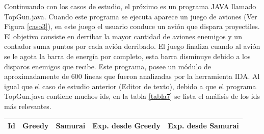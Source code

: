 Continuando con los casos de estudio, el próximo es un programa JAVA llamado TopGun.java. Cuando este programa se ejecuta aparece un juego de aviones (Ver Figura \ref{caso3}), en este juego el usuario conduce un avión que dispara proyectiles. El objetivo consiste en derribar la mayor cantidad de aviones enemigos y un contador suma puntos por cada avión derribado. El juego finaliza cuando al avión se le agota la barra de energía por completo, esta barra disminuye debido a los disparos enemigos que recibe.
Este programa, posee un módulo de aproximadamente de 600 líneas que fueron analizadas por la herramienta IDA.
Al igual que el caso de estudio anterior (Editor de texto), debido a que el programa TopGun.java contiene muchos ids, en la tabla \ref{tabla7} se lista el análisis de los ids más relevantes.

\begin{table}

		\centering
   		\begin{tabular}{| c | c | c | c | c |}     
   		
       \hline
  	   \textbf{Id} & \textbf{Greedy} & \textbf{Samurai} & \textbf{Exp. desde Greedy} & \textbf{Exp. desde Samurai} \\ \hline


\end{tabular}
\end{table}
